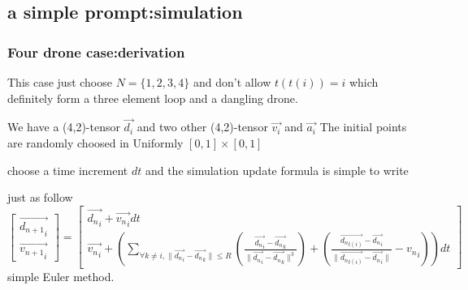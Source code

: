 \documentclass{article}
\theoremstyle{definition} %
\begin{document}
\subsection{a simple prompt:simulation}
\subsubsection{Four drone case:derivation}
This case just choose \(N=\{1,2,3,4\}\)
and don't allow \(t(t(i))=i\)
which definitely form a three element loop and
a dangling drone.

We have a (4,2)-tensor \(\vec{d_i}\)
and two other (4,2)-tensor \(\vec{v_i}\)
and \(\vec{a_i}\)
The initial points are randomly choosed
in Uniformly \([0,1]\times[0,1]\)

choose a time increment \(dt\)
and the simulation update formula is simple to write

just as follow
\[\begin{bmatrix}
        \vec{{d_{n+1}}_i} \\
        \vec{{v_{n+1}}_i}
    \end{bmatrix}=
    \begin{bmatrix}
        \vec{{d_{n}}_i}+\vec{{v_n}_i}dt \\
        \vec{{v_{n}}_i}+(\sum_{\forall k\neq i,\|\vec{{d_n}_i}-\vec{{d_n}_k}\|\leq R}(\frac{\vec{{d_n}_i}-\vec{{d_n}_k}}{\|\vec{{d_n}_i}-\vec{{d_n}_k}\|^3})+(\frac{\vec{{d_n}_{t(i)}}-\vec{{d_n}_i}}{\|\vec{{d_n}_{t(i)}}-\vec{{d_n}_i}\|}-{v_n}_i))dt
    \end{bmatrix}
\]
simple Euler method.
\end{document}
